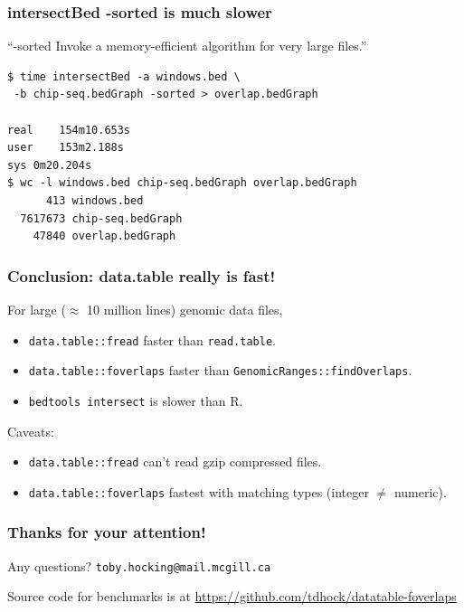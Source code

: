 \documentclass{beamer}
\begin{document}
\begin{frame}[fragile]
  \frametitle{intersectBed -sorted is much slower}

  ``-sorted Invoke a memory-efficient algorithm for very large files.''


\begin{verbatim}
$ time intersectBed -a windows.bed \
 -b chip-seq.bedGraph -sorted > overlap.bedGraph

real	154m10.653s
user	153m2.188s
sys	0m20.204s
$ wc -l windows.bed chip-seq.bedGraph overlap.bedGraph 
      413 windows.bed
  7617673 chip-seq.bedGraph
    47840 overlap.bedGraph
\end{verbatim}


  
\end{frame}

\begin{frame}
  \frametitle{Conclusion: data.table really is fast!}
  For large ($\approx$ 10 million lines) genomic data files,
  \begin{itemize}
  \item \texttt{data.table::fread} faster than \texttt{read.table}.
  \item \texttt{data.table::foverlaps} faster than
    \texttt{GenomicRanges::findOverlaps}.
  \item \texttt{bedtools intersect} is slower than R.
  \end{itemize}

  Caveats:
  \begin{itemize}
  \item \texttt{data.table::fread} can't read gzip compressed files.
  \item \texttt{data.table::foverlaps} fastest with matching types
    (integer $\neq$ numeric).
  \end{itemize}
\end{frame}

\begin{frame}
  \frametitle{Thanks for your attention!}
  Any questions? \texttt{toby.hocking@mail.mcgill.ca}

  \vskip 1cm

  Source code for benchmarks is at
  \url{https://github.com/tdhock/datatable-foverlaps}
\end{frame}
\end{document}
